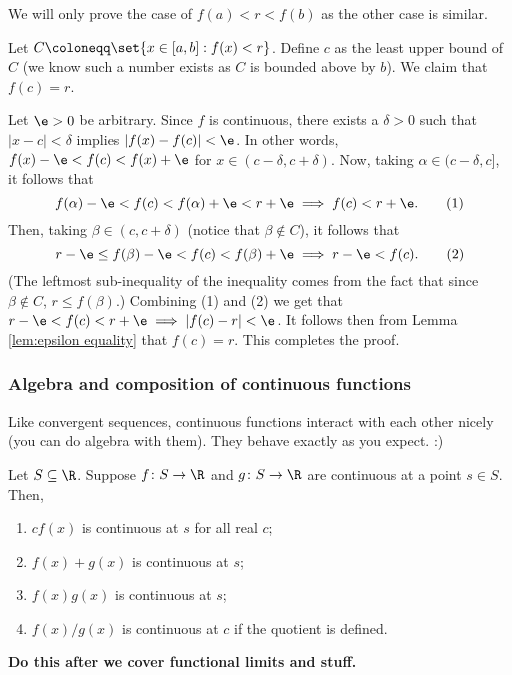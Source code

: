 \documentclass[class=article, crop=false]{standalone}
\begin{document}
\begin{pf}
    We will only prove the case of $f(a) < r <f(b)$ as the other case is similar.

    Let $C \coloneqq \set{x \in [a,b] : f(x) < r}$. Define $c$ as the least upper bound of $C$ (we know such a number exists as $C$ is bounded above by $b$). We claim that $f(c) = r$.

    Let $\e > 0$ be arbitrary. Since $f$ is continuous, there exists a $\delta > 0$ such that $|x-c| < \delta$ implies $|f(x)-f(c)| < \e$. In other words, $f(x)-\e < f(c) < f(x) + \e$ for $x \in (c-\delta, c+\delta)$. Now, taking $\alpha \in (c-\delta, c]$, it follows that
        \[
            f(\alpha) - \e < f(c) < f(\alpha) + \e < r + \e \implies f(c) < r + \e. \tag{1}
        \]
    Then, taking $\beta \in (c,c+\delta)$ (notice that $\beta \not \in C$), it follows that
        \[
            r - \e \leq f(\beta) - \e < f(c) < f(\beta) + \e \implies r-\e < f(c). \tag{2}
        \]
    (The leftmost sub-inequality of the inequality comes from the fact that since $\beta \not \in C$, $r \leq f(\beta)$.) Combining (1) and (2) we get that $r-\e < f(c) < r + \e \implies |f(c)-r| < \e$. It follows then from Lemma \ref{lem:epsilon equality} that $f(c) = r$. This completes the proof.
\end{pf}

\subsubsection*{Algebra and composition of continuous functions}

Like convergent sequences, continuous functions interact with each other nicely (you can do algebra with them). They behave exactly as you expect. :)

\begin{thm}
    Let $S \subseteq \R$. Suppose $f \colon S \to \R$ and $g \colon S \to \R$ are continuous at a point $s \in S$. Then,
        \begin{enumerate}[\normalfont(i)]
            \item $cf(x)$ is continuous at $s$ for all real $c$;
            \item $f(x)+g(x)$ is continuous at $s$;
            \item $f(x)g(x)$ is continuous at $s$;
            \item $f(x)/g(x)$ is continuous at $c$ if the quotient is defined.
        \end{enumerate}
\end{thm}
\begin{pf}
    \textbf{Do this after we cover functional limits and stuff.}
\end{pf}
\end{document}

